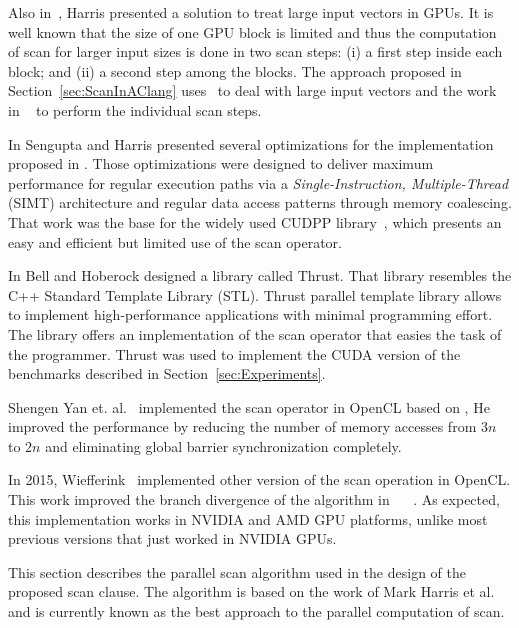 \documentclass[Ingles]{ic-tese-v1}
\newcommand{\rsec}[1]{Section~\ref{sec:#1}}
\begin{document}
Also  in~\cite{harris2007parallel},  Harris  presented a  solution  to
treat large input vectors in GPUs.  It  is well known that the size of
one GPU block  is limited and thus the computation  of scan for larger
input sizes is  done in two scan  steps: (i) a first  step inside each
block; and (ii) a second step among the blocks.  The approach proposed
in  \rsec{ScanInAClang}  uses~\cite{harris2007parallel} to  deal  with
large input vectors and the work in ~\cite{ScanAsPrimitive} to perform
the individual scan steps.

In   \cite{Sengupta:2008}  Sengupta   and  Harris   presented  several
optimizations     for      the     implementation      proposed     in
\cite{harris2007parallel}.   Those  optimizations   were  designed  to
deliver  maximum  performance  for   regular  execution  paths  via  a
\textit{Single-Instruction,  Multiple-Thread} (SIMT)  architecture and
regular data access patterns through memory coalescing.  That work was
the  base  for  the  widely  used  CUDPP  library~\cite{CUDPP},  which
presents an easy and efficient but limited use of the scan operator.

In  \cite{Nathan:2011} Bell  and  Hoberock designed  a library  called
Thrust.   That library  resembles  the C++  Standard Template  Library
(STL).   Thrust  parallel   template  library   allows  to   implement
high-performance  applications with  minimal  programming effort.  The
library offers an implementation of the scan operator that easies the task of
the programmer.  Thrust  was used  to implement  the CUDA version of the
benchmarks described in \rsec{Experiments}.

Shengen Yan et.  al.~\cite{Yan:2013}  implemented the scan operator in
OpenCL based on \cite{harris2007parallel},  He improved the performance
by  reducing the  number  of memory  accesses from  $3n$  to $2n$  and
eliminating global barrier synchronization completely.

In 2015, Wiefferink~\cite{ScanOpenCL} implemented other version of the
scan operation in OpenCL.  This work improved the branch divergence of
the  algorithm in  ~\cite{ScanAsPrimitive} ~\cite{harris2007parallel}.
As  expected,  this  implementation  works   in  NVIDIA  and  AMD  GPU
platforms, unlike  most previous versions  that just worked  in NVIDIA
GPUs.

This section describes the parallel  scan algorithm used in the design
of the  proposed scan clause.  The algorithm is  based on the  work of
Mark Harris et al.~\cite{Sengupta:2007} and  is currently known as the best
approach to the parallel computation of scan.
\end{document}
